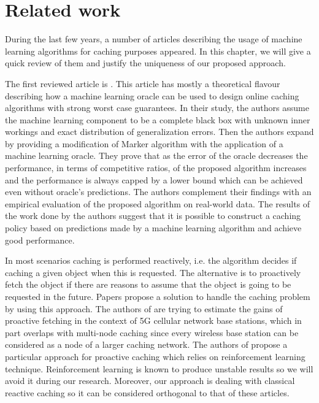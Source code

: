\section{Related work} \label{related_work}

During the last few years, a number of articles describing the usage of machine learning algorithms for caching purposes appeared. In this chapter, we will give a quick review of them and justify the uniqueness of our proposed approach.

The first reviewed article is \cite{18}. This article has mostly a theoretical flavour describing how a machine learning oracle can be used to design online caching algorithms with strong worst case guarantees. In their study, the authors assume the machine learning component to be a complete black box with unknown inner workings and exact distribution of generalization errors. Then the authors expand by providing a modification of Marker algorithm \cite{26} with the application of a machine learning oracle. They prove that as the error of the oracle decreases the performance, in terms of competitive ratios, of the proposed algorithm increases and the performance is always capped by a lower bound which can be achieved even without oracle's predictions. The authors complement their findings with an empirical evaluation of the proposed algorithm on real-world data. The results of the work done by the authors suggest that it is possible to construct a caching policy based on predictions made by a machine learning algorithm and achieve good performance.

In most scenarios caching is performed reactively, i.e. the algorithm decides if caching a given object when this is requested. The alternative is to proactively fetch the object if there are reasons to assume that the object is going to be requested in the future. Papers \cite{20, 21} propose a solution to handle the caching problem by using this approach. The authors of \cite{20} are trying to estimate the gains of proactive fetching in the context of 5G cellular network base stations, which in part overlaps with multi-node caching since every wireless base station can be considered as a node of a larger caching network. The authors of \cite{21} propose a particular approach for proactive caching which relies on reinforcement learning technique. Reinforcement learning is known to produce unstable results so we will avoid it during our research. Moreover, our approach is dealing with classical reactive caching so it can be considered orthogonal to that of these articles.

